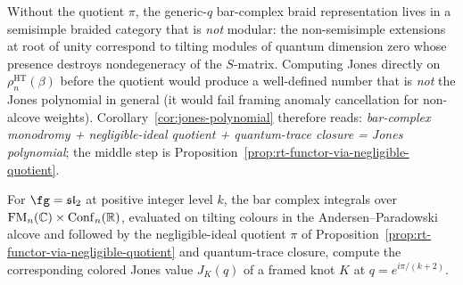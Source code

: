 \begin{remark}
\label{rem:negligible-not-optional}
Without the quotient $\pi$, the generic-$q$ bar-complex braid representation lives in a semisimple braided category that is \emph{not} modular: the non-semisimple extensions at root of unity correspond to tilting modules of quantum dimension zero whose presence destroys nondegeneracy of the $S$-matrix. Computing Jones directly on $\rho_n^{\mathrm{HT}}(\beta)$ before the quotient would produce a well-defined number that is \emph{not} the Jones polynomial in general (it would fail framing anomaly cancellation for non-alcove weights). Corollary~\ref{cor:jones-polynomial} therefore reads: \emph{bar-complex monodromy + negligible-ideal quotient + quantum-trace closure = Jones polynomial}; the middle step is Proposition~\ref{prop:rt-functor-via-negligible-quotient}.
\end{remark}

\begin{corollary}
\label{cor:jones-polynomial}
For $\fg = \mathfrak{sl}_2$ at positive integer level $k$, the bar
complex integrals over $\mathrm{FM}_n(\mathbb C) \times \mathrm{Conf}_n(\mathbb R)$, evaluated on
tilting colours in the Andersen--Paradowski alcove and followed by the
negligible-ideal quotient $\pi$ of
Proposition~\ref{prop:rt-functor-via-negligible-quotient} and
quantum-trace closure, compute the corresponding colored Jones value
$J_K(q)$ of a framed knot $K$ at $q = e^{i\pi/(k+2)}$.
\end{corollary}

